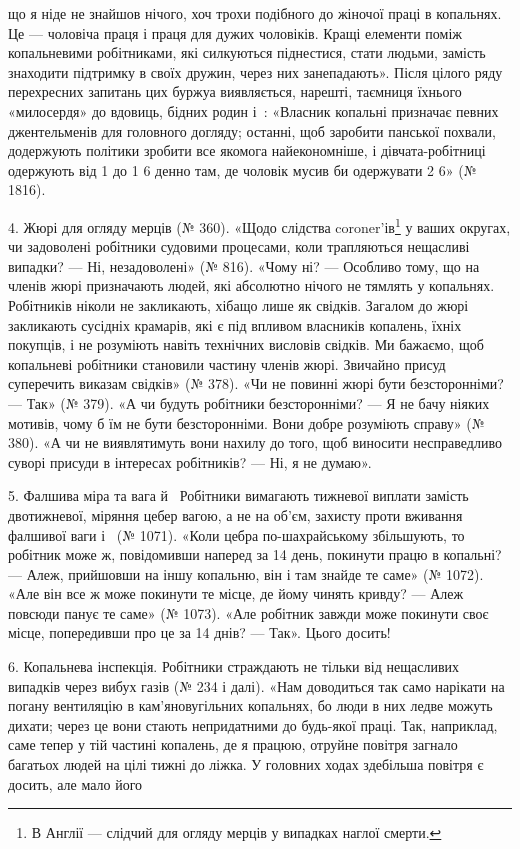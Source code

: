 \parcont{}  %
що я ніде не знайшов нічого, хоч трохи подібного до жіночої
праці в копальнях. Це — чоловіча праця і праця для дужих
чоловіків. Кращі елементи поміж копальневими робітниками,
які силкуються піднестися, стати людьми, замість знаходити підтримку
в своїх дружин, через них занепадають». Після цілого
ряду перехресних запитань цих буржуа виявляється, нарешті,
таємниця їхнього «милосердя» до вдовиць, бідних родин і~:
«Власник копальні призначає певних джентельменів для головного
догляду; останні, щоб заробити панської похвали, додержують
політики зробити все якомога найекономніше, і дівчата-робітниці
одержують від 1 до 1 6 денно там,
де чоловік мусив би одержувати 2 6» (№ 1816).

4. Жюрі для огляду мерців (№ 360). «Щодо слідства coroner’ів\footnote*{
В Англії — слідчий для огляду мерців у випадках наглої смерти. 
}
у ваших округах, чи задоволені робітники судовими процесами,
коли трапляються нещасливі випадки? — Ні, незадоволені»
(№ 816). «Чому ні? — Особливо тому, що на членів жюрі призначають
людей, які абсолютно нічого не тямлять у копальнях. Робітників
ніколи не закликають, хібащо лише як свідків. Загалом
до жюрі закликають сусідніх крамарів, які є під впливом власників
копалень, їхніх покупців, і не розуміють навіть технічних
висловів свідків. Ми бажаємо, щоб копальневі робітники становили
частину членів жюрі. Звичайно присуд суперечить виказам
свідків» (№ 378). «Чи не повинні жюрі бути безсторонніми? —
Так» (№ 379). «А чи будуть робітники безсторонніми? — Я не
бачу ніяких мотивів, чому б їм не бути безсторонніми. Вони
добре розуміють справу» (№ 380). «А чи не виявлятимуть вони
нахилу до того, щоб виносити несправедливо суворі присуди в
інтересах робітників? — Ні, я не думаю».

5. Фалшива міра та вага й~ Робітники вимагають тижневої
виплати замість двотижневої, міряння цебер вагою, а не
на об’єм, захисту проти вживання фалшивої ваги і~
(№ 1071). «Коли цебра по-шахрайському збільшують, то робітник
може ж, повідомивши наперед за 14 день, покинути працю
в копальні? — Алеж, прийшовши на іншу копальню, він і там
знайде те саме» (№ 1072). «Але він все ж може покинути те місце,
де йому чинять кривду? — Алеж повсюди панує те саме» (№ 1073).
«Але робітник завжди може покинути своє місце, попередивши
про це за 14 днів? — Так». Цього досить!

6. Копальнева інспекція. Робітники страждають не тільки
від нещасливих випадків через вибух газів (№ 234 і далі). «Нам
доводиться так само нарікати на погану вентиляцію в кам’яновугільних
копальнях, бо люди в них ледве можуть дихати;
через це вони стають непридатними до будь-якої праці. Так,
наприклад, саме тепер у тій частині копалень, де я працюю,
отруйне повітря загнало багатьох людей на цілі тижні до ліжка.
У головних ходах здебільша повітря є досить, але мало його
\parbreak{}  %
